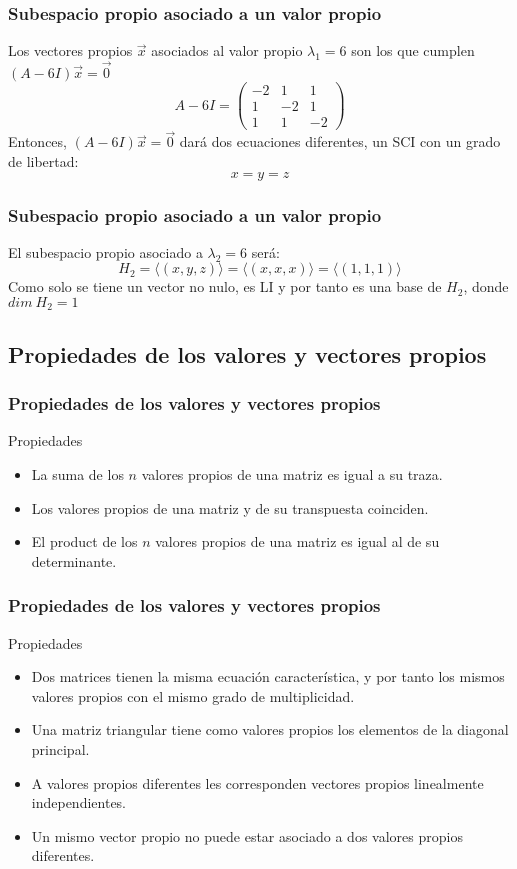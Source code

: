 \documentclass{beamer}
\begin{document}
\begin{frame}
\frametitle{Subespacio propio asociado a un valor propio}
Los vectores propios $\vec x$ asociados al valor propio $\lambda_1 = 6$ son los que cumplen $(A-6I)\vec x = \vec 0$
\[A-6 I=\left(\begin{array}{ccc}-2 & 1 & 1 \\1 & -2 & 1 \\1 & 1 & -2\end{array}\right)\]
Entonces, $(A-6I)\vec x = \vec 0$ dar\'a dos ecuaciones diferentes, un SCI con un grado de libertad:
\[x=y=z\]
\end{frame}




\begin{frame}
\frametitle{Subespacio propio asociado a un valor propio}
El subespacio propio asociado a $\lambda_2=6$ ser\'a:
\[H_2 = \langle (x,y,z) \rangle = \langle (x,x,x) \rangle = \langle (1,1,1) \rangle\]
Como solo se tiene un vector no nulo, es LI y por tanto es una base de $H_2$, donde $dim\ H_2 = 1$
\end{frame}

\subsection{Propiedades de los valores y vectores propios}

\begin{frame}
\frametitle{Propiedades de los valores y vectores propios}
\begin{block}{Propiedades}
\begin{itemize}
\item La suma de los $n$ valores propios de una matriz es igual a su traza.
\item Los valores propios de una matriz y de su transpuesta coinciden.
\item El product de los $n$ valores propios de una matriz es igual al de su determinante.
\end{itemize}
\end{block}
\end{frame}

\begin{frame}
\frametitle{Propiedades de los valores y vectores propios}
\begin{block}{Propiedades}
\begin{itemize}
\item Dos matrices tienen la misma ecuaci\'on caracter\'istica, y por tanto los mismos valores propios con el mismo grado de multiplicidad.
\item Una matriz triangular tiene como valores propios los elementos de la diagonal principal. 
\item A valores propios diferentes les corresponden vectores propios linealmente independientes.
\item Un mismo vector propio no puede estar asociado a dos valores propios diferentes. 
\end{itemize}
\end{block}
\end{frame}
\end{document}
